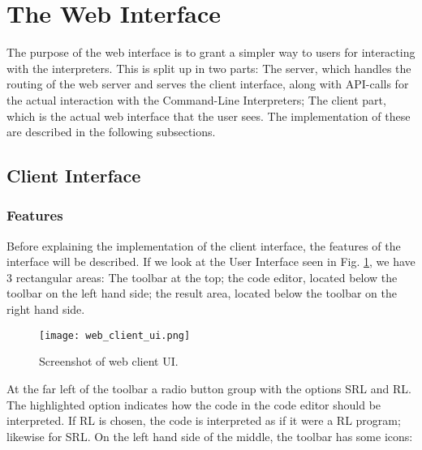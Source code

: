 
\section{The Web Interface}

The purpose of the web interface is to grant a simpler way to users for interacting with the interpreters.
This is split up in two parts:
The server, which handles the routing of the web server and serves the client interface, along with API-calls for the actual interaction with the Command-Line Interpreters;
The client part, which is the actual web interface that the user sees.
The implementation of these are described in the following subsections.

\subsection{Client Interface}
\label{sec:implementation_web_client}


\subsubsection{Features}

Before explaining the implementation of the client interface, the features of the interface will be described.
If we look at the User Interface seen in Fig. \ref{fig:web_client_ui}, we have 3 rectangular areas: The toolbar at the top; the code editor, located below the toolbar on the left hand side; the result area, located below the toolbar on the right hand side.

\begin{figure}
  \texttt{[image: web\_client\_ui.png]}
  \caption{Screenshot of web client UI.}
  \label{fig:web_client_ui}
\end{figure}

At the far left of the toolbar a radio button group with the options SRL and RL. The highlighted option indicates how the code in the code editor should be interpreted. If RL is chosen, the code is interpreted as if it were a RL program; likewise for SRL.
On the left hand side of the middle, the toolbar has some icons:

